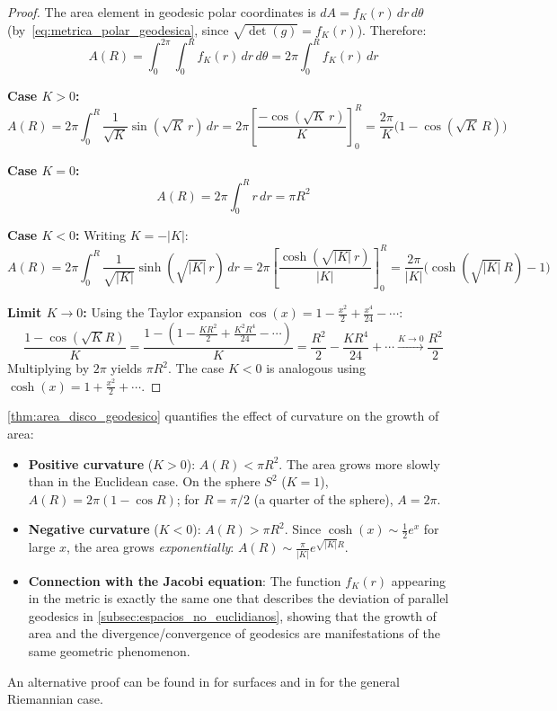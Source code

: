 \begin{proof}
The area element in geodesic polar coordinates is $dA = f_K(r) \, dr \, d\theta$ (by~\eqref{eq:metrica_polar_geodesica}, since $\sqrt{\det(g)} = f_K(r)$). Therefore:
\[
A(R) = \int_0^{2\pi} \int_0^R f_K(r) \, dr \, d\theta = 2\pi \int_0^R f_K(r) \, dr
\]

\textbf{Case $K > 0$:}
\[
A(R) = 2\pi \int_0^R \frac{1}{\sqrt{K}} \sin(\sqrt{K} \, r) \, dr = 2\pi \left[ \frac{-\cos(\sqrt{K} \, r)}{K} \right]_0^R = \frac{2\pi}{K} \bigl(1 - \cos(\sqrt{K} \, R)\bigr)
\]

\textbf{Case $K = 0$:}
\[
A(R) = 2\pi \int_0^R r \, dr = \pi R^2
\]

\textbf{Case $K < 0$:} Writing $K = -|K|$:
\[
A(R) = 2\pi \int_0^R \frac{1}{\sqrt{|K|}} \sinh(\sqrt{|K|} \, r) \, dr = 2\pi \left[ \frac{\cosh(\sqrt{|K|} \, r)}{|K|} \right]_0^R = \frac{2\pi}{|K|} \bigl(\cosh(\sqrt{|K|} \, R) - 1\bigr)
\]

\textbf{Limit $K \to 0$:} Using the Taylor expansion $\cos(x) = 1 - \frac{x^2}{2} + \frac{x^4}{24} - \cdots$:
\[
\frac{1 - \cos(\sqrt{K} R)}{K} = \frac{1 - \left(1 - \frac{KR^2}{2} + \frac{K^2 R^4}{24} - \cdots\right)}{K} = \frac{R^2}{2} - \frac{K R^4}{24} + \cdots \xrightarrow{K \to 0} \frac{R^2}{2}
\]
Multiplying by $2\pi$ yields $\pi R^2$. The case $K < 0$ is analogous using $\cosh(x) = 1 + \frac{x^2}{2} + \cdots$.
\end{proof}

\begin{remark}\label{rem:area_disco_interpretacion}
\autoref{thm:area_disco_geodesico} quantifies the effect of curvature on the growth of area:
\begin{itemize}
    \item \textbf{Positive curvature} ($K > 0$): $A(R) < \pi R^2$. The area grows more slowly than in the Euclidean case. On the sphere $S^2$ ($K = 1$), $A(R) = 2\pi(1 - \cos R)$; for $R = \pi/2$ (a quarter of the sphere), $A = 2\pi$.
    \item \textbf{Negative curvature} ($K < 0$): $A(R) > \pi R^2$. Since $\cosh(x) \sim \frac{1}{2}e^x$ for large $x$, the area grows \textit{exponentially}: $A(R) \sim \frac{\pi}{|K|} e^{\sqrt{|K|} R}$.
    \item \textbf{Connection with the Jacobi equation}: The function $f_K(r)$ appearing in the metric is exactly the same one that describes the deviation of parallel geodesics in \autoref{subsec:espacios_no_euclidianos}, showing that the growth of area and the divergence/convergence of geodesics are manifestations of the same geometric phenomenon.
\end{itemize}
An alternative proof can be found in \citet[Chapter~4, Section~4.6]{do1976differential} for surfaces and in \citet[Theorem~11.9]{lee2018introduction} for the general Riemannian case.
\end{remark}

